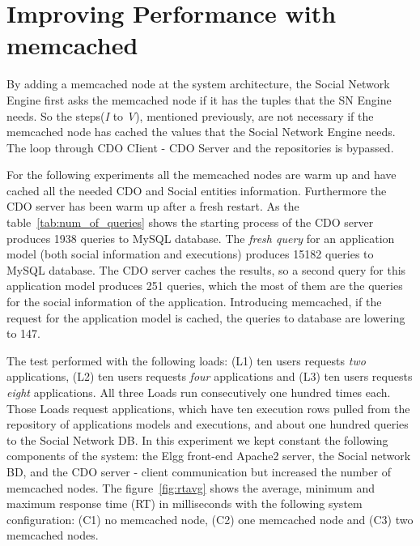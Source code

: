 \section{Improving Performance with memcached}
\label{sec:eval_memcache}
By adding a memcached node at the system architecture, the Social Network Engine first asks the memcached node if it has the tuples that the SN Engine needs. So the steps(\emph{I} to \emph{V}), mentioned previously, are not necessary if the memcached node has cached the values that the Social Network Engine needs. The loop through CDO CIient - CDO Server and the repositories is bypassed. 

For the following experiments all the memcached nodes are warm up and have cached all the needed CDO and Social entities information. Furthermore the CDO server has been warm up after a fresh restart. As the table~\ref{tab:num_of_queries} shows
the starting process of the CDO server produces 1938 queries to MySQL database. The \emph{fresh query} for an application model (both social information and executions) produces 15182 queries to MySQL database. The CDO server caches the results, so a second query for this application model produces 251 queries, which the most of them are the queries for the social information of the application. Introducing memcached, if the request for the application model is cached, the queries to database are lowering to 147.  

The test performed with the following loads: (L1) ten users requests \emph{two} applications, (L2) ten users requests \emph{four} applications and (L3) ten users requests \emph{eight} applications. All three Loads run consecutively one hundred times each. Those Loads request applications, which have ten execution rows pulled from the repository of applications models and executions, and about one hundred queries to the Social Network DB. In this experiment we kept constant the following components of the system: the Elgg front-end Apache2 server, the Social network BD, and the CDO server - client communication but increased the number of memcached nodes.
The figure~\ref{fig:rtavg} shows the  average, minimum and maximum response time (RT) in milliseconds with the following system configuration: (C1) no memcached node, (C2) one memcached node and (C3) two memcached nodes.

